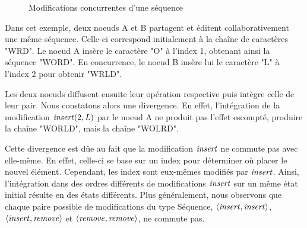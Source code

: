\begin{figure}[!ht]
{
  }
  \caption{Modifications concurrentes d'une séquence}
  \label{fig:seq-conflit}
\end{figure}

Dans cet exemple, deux noeuds A et B partagent et éditent collaborativement une même séquence.
Celle-ci correspond initialement à la chaîne de caractères "WRD".
Le noeud A insère le caractère "O" à l'index 1, obtenant ainsi la séquence "WORD".
En concurrence, le noeud B insère lui le caractère "L" à l'index 2 pour obtenir "WRLD".

Les deux noeuds diffusent ensuite leur opération respective puis intègre celle de leur pair.
Nous constatons alors une divergence.
En effet, l'intégration de la modification $\mathit{insert}(2,L)$ par le noeud A ne produit pas l'effet escompté, \ie produire la chaîne "WORLD", mais la chaîne "WOLRD".

Cette divergence est dûe au fait que la modification $\mathit{insert}$ ne commute pas avec elle-même.
En effet, celle-ci se base sur un index pour déterminer où placer le nouvel élément.
Cependant, les index sont eux-mêmes modifiés par $\mathit{insert}$.
Ainsi, l'intégration dans des ordres différents de modifications $\mathit{insert}$ sur un même état initial résulte en des états différents.
Plus généralement, nous observons que chaque paire possible de modifications du type Séquence, \ie $\langle \mathit{insert},\mathit{insert} \rangle$, $\langle \mathit{insert},\mathit{remove} \rangle$ et $\langle \mathit{remove},\mathit{remove} \rangle$, ne commute pas.

